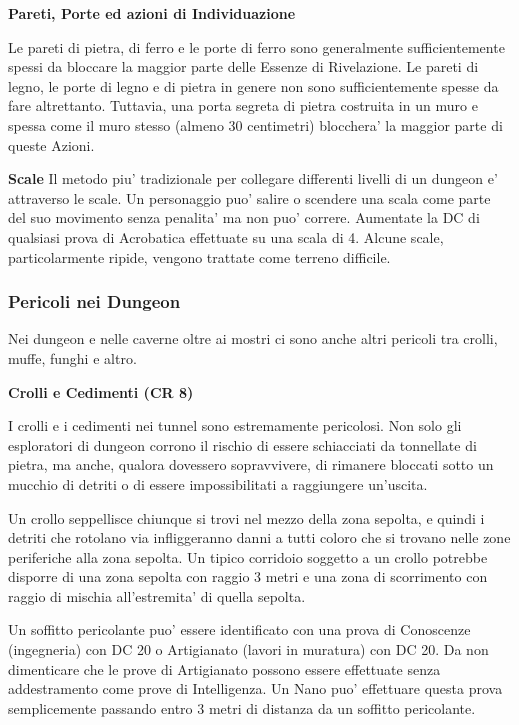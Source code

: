\documentclass[a4paper,11pt,twoside,openany]{book}
\begin{document}
\textbf{Pareti, Porte ed azioni di Individuazione}

Le pareti di pietra, di ferro e le porte di ferro sono generalmente sufficientemente spessi da bloccare la maggior parte delle Essenze di Rivelazione. Le pareti di legno, le porte di legno e di pietra in genere non sono sufficientemente spesse da fare altrettanto. Tuttavia, una porta segreta di pietra costruita in un muro e spessa come il muro stesso (almeno 30 centimetri) blocchera' la maggior parte di queste Azioni.

\textbf{Scale} Il metodo piu' tradizionale per collegare differenti livelli di un dungeon e' attraverso le scale. Un personaggio puo' salire o scendere una scala come parte del suo movimento senza penalita' ma non puo' correre. Aumentate la DC di qualsiasi prova di Acrobatica effettuate su una scala di 4. Alcune scale, particolarmente ripide, vengono trattate come terreno difficile.

\subsubsection{Pericoli nei Dungeon}

Nei dungeon e nelle caverne oltre ai mostri ci sono anche altri pericoli tra crolli, muffe, funghi e altro.

\textbf{Crolli e Cedimenti (CR 8)}

I crolli e i cedimenti nei tunnel sono estremamente pericolosi. Non solo gli esploratori di dungeon corrono il rischio di essere schiacciati da tonnellate di pietra, ma anche, qualora dovessero sopravvivere, di rimanere bloccati sotto un mucchio di detriti o di essere impossibilitati a raggiungere un'uscita.

Un crollo seppellisce chiunque si trovi nel mezzo della zona sepolta, e quindi i detriti che rotolano via infliggeranno danni a tutti coloro che si trovano nelle zone periferiche alla zona sepolta. Un tipico corridoio soggetto a un crollo potrebbe disporre di una zona sepolta con raggio 3 metri e una zona di scorrimento con raggio di mischia all'estremita' di quella sepolta.

Un soffitto pericolante puo' essere identificato con una prova di Conoscenze (ingegneria) con DC 20 o Artigianato (lavori in muratura) con DC 20. Da non dimenticare che le prove di Artigianato possono essere effettuate senza addestramento come prove di Intelligenza. Un Nano puo' effettuare questa prova semplicemente passando entro 3 metri di distanza da un soffitto pericolante. 
\end{document}
